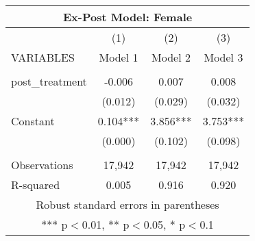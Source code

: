 \begin{tabular}{lccc}
\multicolumn{4}{c}{Ex-Post Model: Female} \\ \hline
 & (1) & (2) & (3) \\
VARIABLES & Model 1 & Model 2 & Model 3 \\ \hline
 &  &  &  \\
post\_treatment & -0.006 & 0.007 & 0.008 \\
 & (0.012) & (0.029) & (0.032) \\
Constant & 0.104*** & 3.856*** & 3.753*** \\
 & (0.000) & (0.102) & (0.098) \\
 &  &  &  \\
Observations & 17,942 & 17,942 & 17,942 \\
 R-squared & 0.005 & 0.916 & 0.920 \\ \hline
\multicolumn{4}{c}{ Robust standard errors in parentheses} \\
\multicolumn{4}{c}{ *** p$<$0.01, ** p$<$0.05, * p$<$0.1} \\
\end{tabular}
